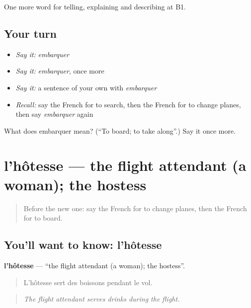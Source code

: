 \begin{grammarlens}[title={What you've built}]
One more word for telling, explaining and describing at B1.
\end{grammarlens}

\subsection*{Your turn}
\begin{itemize}
\raggedright
  \item \emph{Say it:} \emph{embarquer}
  \item \emph{Say it:} \emph{embarquer}, once more
  \item \emph{Say it:} a sentence of your own with \emph{embarquer}
  \item \emph{Recall:} say the French for to search, then the French for to change planes, then say \emph{embarquer} again
\end{itemize}

\begin{tcolorbox}[breakable,colback=teal!4,colframe=teal!35!black,title={Before you move on}]
What does embarquer mean? (\textquotedblleft{}To board; to take along\textquotedblright{}.) Say it once more.
\end{tcolorbox}
\section[l'hôtesse]{l'hôtesse — the flight attendant (a woman); the hostess}

\label{lesson:FR-C418-hotesse}



\begin{quote}
Before the new one: say the French for to change planes, then the French for to board.
\end{quote}

\subsection*{You'll want to know: l'hôtesse}
\textbf{l'hôtesse} — \textquotedblleft{}the flight attendant (a woman); the hostess\textquotedblright{}.

\begin{quote}
L'hôtesse sert des boissons pendant le vol.
\end{quote}

\begin{quote}
\emph{The flight attendant serves drinks during the flight.}
\end{quote}


